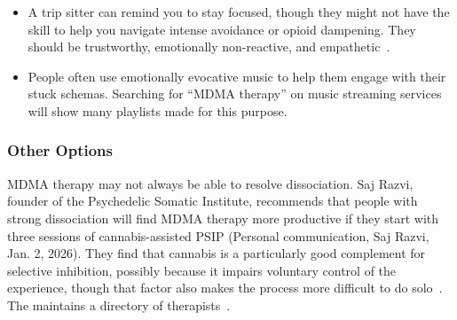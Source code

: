 \documentclass[11pt,oneside]{book}
\let\cite\parencite
\begin{document}
\begin{itemize}
    After a period of focus, and presumably reconsolidation,\footnote{\textcite{razviPSIP} doesn't frame the process in terms of reconsolidation, but I think it is clearly facilitating reconsolidation.} during which the sensations may grow and dissipate in wave patterns,\footnote{I speculate that each wave is the activation and reconsolidation of an individual schema that produces opioid dampening.} the opioid dampening recedes and transitions to flight-or-flight. Depending on the strength of opioid dampening, anywhere from minutes to a full day-long session of selective inhibition is needed.

    This is the core process in their therapeutic method called psychedelic somatic interactional psychotherapy (PSIP). I am unclear how achievable this process is in solo MDMA therapy without a practitioner skilled in the method.

    An MDMA booster dose can extend the session to deal with particularly resistant opioid dampening.
    \item A trip sitter can remind you to stay focused, though they might not have the skill to help you navigate intense avoidance or opioid dampening. They should be trustworthy, emotionally non-reactive, and empathetic~\cite{thalSitter}.
    \item People often use emotionally evocative music to help them engage with their stuck schemas. Searching for \enquote{MDMA therapy} on music streaming services will show many playlists made for this purpose.
\end{itemize}

\subsubsection*{Other Options}
MDMA therapy may not always be able to resolve dissociation. Saj Razvi, founder of the Psychedelic Somatic Institute, recommends that people with strong dissociation will find MDMA therapy more productive if they start with three sessions of cannabis-assisted PSIP (Personal communication, Saj Razvi, Jan. 2, 2026). They find that cannabis is a particularly good complement for selective inhibition, possibly because it impairs voluntary control of the experience, though that factor also makes the process more difficult to do solo~\cite{razviPSIP}. The  maintains a directory of therapists~\cite{psipDirectory}.
\end{document}
